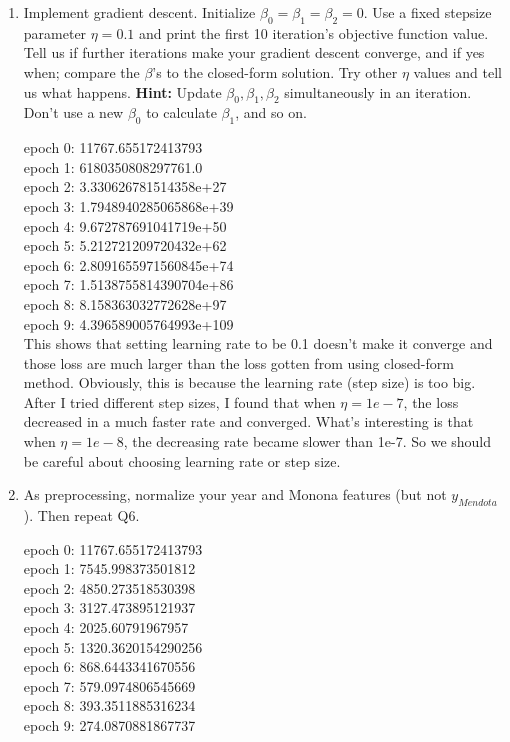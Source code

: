 \documentclass[a4paper]{article}
\theoremstyle{definition}
\newenvironment{soln}{
    \leavevmode\color{blue}\ignorespaces
}{}
\begin{document}
\begin{enumerate}
\item
Implement gradient descent.  Initialize $\beta_0= \beta_1= \beta_2=0$.  Use a fixed stepsize parameter $\eta=0.1$ and print the first 10 iteration's objective function value.
Tell us if further iterations make your gradient descent converge, and if yes when; compare the $\beta$'s to the closed-form solution.
Try other $\eta$ values and tell us what happens.
\textbf{Hint:} Update $\beta_0, \beta_1, \beta_2$ simultaneously in an iteration.  Don't use a new $\beta_0$ to calculate $\beta_1$, and so on.

\begin{soln}
epoch 0:  11767.655172413793\\
epoch 1:  6180350808297761.0\\
epoch 2:  3.330626781514358e+27\\
epoch 3:  1.7948940285065868e+39\\
epoch 4:  9.672787691041719e+50\\
epoch 5:  5.212721209720432e+62\\
epoch 6:  2.8091655971560845e+74\\
epoch 7:  1.5138755814390704e+86\\
epoch 8:  8.158363032772628e+97\\
epoch 9:  4.396589005764993e+109\\

This shows that setting learning rate to be 0.1 doesn't make it converge and those loss are much larger than the loss gotten from using closed-form method.
Obviously, this is because the learning rate (step size) is too big. After I tried different step sizes, I found that when $\eta = 1e-7$, the loss decreased in a much faster rate and converged. What's interesting is that when $\eta = 1e-8$, the decreasing rate became slower than 1e-7. So we should be careful about choosing learning rate or step size.

\end{soln}


\item
As preprocessing, normalize your year and Monona features (but not $y_{Mendota}$).
Then repeat Q6.

\begin{soln}
epoch 0:  11767.655172413793\\
epoch 1:  7545.998373501812\\
epoch 2:  4850.273518530398\\
epoch 3:  3127.473895121937\\
epoch 4:  2025.60791967957\\
epoch 5:  1320.3620154290256\\
epoch 6:  868.6443341670556\\
epoch 7:  579.0974806545669\\
epoch 8:  393.3511885316234\\
epoch 9:  274.0870881867737\\
\end{soln}


\end{enumerate}
\end{document}
